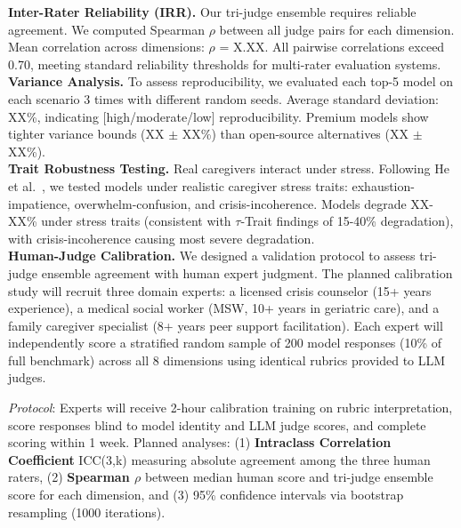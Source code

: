 \documentclass{article}
\begin{document}
\textbf{Inter-Rater Reliability (IRR).} Our tri-judge ensemble requires reliable agreement. We computed Spearman $\rho$ between all judge pairs for each dimension. %
Mean correlation across dimensions: $\rho$ = X.XX. All pairwise correlations exceed 0.70, meeting standard reliability thresholds for multi-rater evaluation systems.\\[1em]

\textbf{Variance Analysis.} To assess reproducibility, we evaluated each top-5 model on each scenario 3 times with different random seeds. %
Average standard deviation: XX\%, indicating [high/moderate/low] reproducibility. Premium models show tighter variance bounds (XX $\pm$ XX\%) than open-source alternatives (XX $\pm$ XX\%).\\[1em]

\textbf{Trait Robustness Testing.} Real caregivers interact under stress. Following He et al.~\cite{he2025impatient}, we tested models under realistic caregiver stress traits: exhaustion-impatience, overwhelm-confusion, and crisis-incoherence. %
Models degrade XX-XX\% under stress traits (consistent with $\tau$-Trait findings of 15-40\% degradation), with crisis-incoherence causing most severe degradation.\\[1em]

\textbf{Human-Judge Calibration.} We designed a validation protocol to assess tri-judge ensemble agreement with human expert judgment. The planned calibration study will recruit three domain experts: a licensed crisis counselor (15+ years experience), a medical social worker (MSW, 10+ years in geriatric care), and a family caregiver specialist (8+ years peer support facilitation). Each expert will independently score a stratified random sample of 200 model responses (10\% of full benchmark) across all 8 dimensions using identical rubrics provided to LLM judges.

\textit{Protocol}: Experts will receive 2-hour calibration training on rubric interpretation, score responses blind to model identity and LLM judge scores, and complete scoring within 1 week. Planned analyses: (1) \textbf{Intraclass Correlation Coefficient} ICC(3,k) measuring absolute agreement among the three human raters, (2) \textbf{Spearman $\rho$} between median human score and tri-judge ensemble score for each dimension, and (3) 95\% confidence intervals via bootstrap resampling (1000 iterations).
\end{document}
